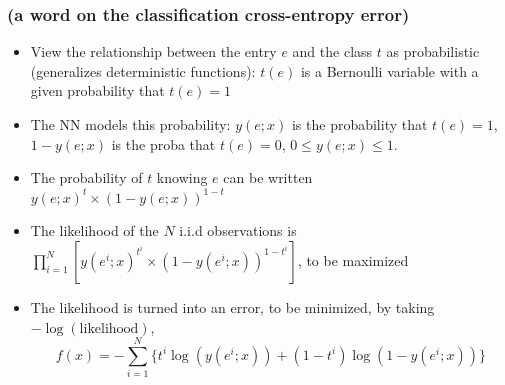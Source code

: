 \documentclass[12pt]{beamer}
\begin{document}
\begin{frame}
\frametitle{\small (a word on the classification cross-entropy error)}
\begin{itemize}
\item View the relationship between the entry $e$ and the class $t$ as probabilistic (generalizes deterministic functions): $t(e)$ is a Bernoulli variable with a given probability that $t(e)=1$
\item The NN models this probability: $y(e;x)$ is the probability that $t(e)=1$, $1-y(e;x)$ is the proba that $t(e)=0$, $0\le y(e;x) \le 1$.
\item The probability of $t$ knowing $e$ can be written $y(e;x)^{t}\times(1-y(e;x))^{1-t}$
\item The likelihood of the $N$ i.i.d observations is $\prod_{i=1}^N \left[y(e^i;x)^{t^i}\times(1-y(e^i;x))^{1-t^i}\right]$, to be maximized
\item The likelihood is turned into an error, to be minimized, by taking $-\log(\text{likelihood})$, 
\begin{equation*}
f(x) = - \sum_{i=1}^N \{ t^i \log(y(e^i;x)) + (1-t^i) \log(1 - y(e^i;x))\}
\end{equation*}
\end{itemize}
\end{frame}
\end{document}
